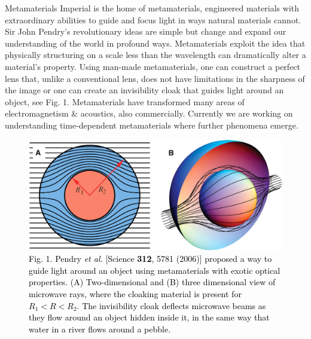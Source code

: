 \documentclass[xcolor={table}]{beamer}
\begin{document}
\begin{frame}[fragile=singleslide,t]
\begin{columns}[onlytextwidth,T]
\begin{column}{.47\textwidth}
\begin{block}{Metamaterials}
Imperial is the home of metamaterials, engineered materials with extraordinary abilities to guide and focus light in ways natural materials cannot. Sir John Pendry's revolutionary ideas are simple but change and expand our understanding of the world in profound ways.
Metamaterials exploit the idea that physically structuring on a scale less than the wavelength can dramatically alter a material’s property. Using man-made metamaterials, one can construct a perfect lens that, unlike a conventional lens, does not have limitations in the sharpness of the image or one can  create an invisibility cloak that guides light around an object, see Fig. 1. Metamaterials have transformed many areas of electromagnetism \& acoustics,  also commercially. Currently we are working on understanding time-dependent metamaterials where further phenomena emerge.
\end{block}
\vspace*{-1.5cm}
\begin{figure}
\centering
    \includegraphics[width=0.9\columnwidth]{Cloak.jpeg}
    \caption{\footnotesize \textcolor{black}{Fig. 1. Pendry {\it \footnotesize et al.} [Science {\bf \footnotesize 312}, 5781 (2006)] proposed a way to guide light around an object using metamaterials with exotic optical properties. (A) Two-dimensional and (B) three dimensional view of microwave rays, where the cloaking material is present for $R_1 < R < R_2$. The invisibility cloak deflects microwave beams as they flow around an object hidden inside it, in the same way that water in a river flows around a pebble.}}
\end{figure}


\end{column}
\end{columns}
\end{frame}
\end{document}

